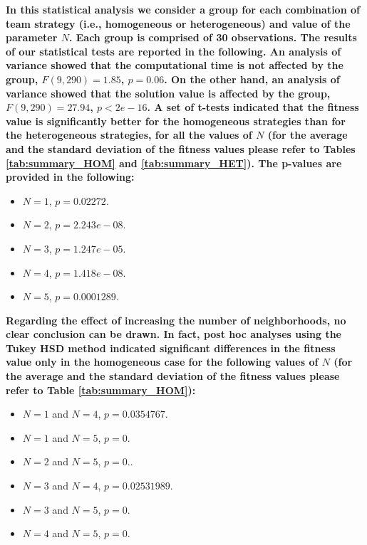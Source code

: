 \documentclass[journal]{IEEEtran}
\begin{document}
\textbf{In this statistical analysis we consider a group for each combination of team strategy (i.e., homogeneous or heterogeneous) and value of the parameter $N$. Each group is comprised of 30 observations. The results of our statistical tests are reported in the following. An analysis of variance showed that the computational time is not affected by the group, $F(9,290) = 1.85$, $p = 0.06$. On the other hand, an analysis of variance showed that the solution value is affected by the group, $F(9,290) = 27.94$, $p < 2e-16$.  A set of t-tests indicated that the fitness value is significantly better for the homogeneous strategies than for the heterogeneous strategies, for all the values of $N$ (for the average and the standard deviation of the fitness values please refer to Tables \ref{tab:summary_HOM} and \ref{tab:summary_HET}). The p-values are provided in the following:}

\begin{itemize}
\item $N=1$, $p = 0.02272$.
\item $N=2$, $p = 2.243e-08$.
\item $N=3$, $p = 1.247e-05$.
\item $N=4$, $p = 1.418e-08$.
\item $N=5$, $p = 0.0001289$.
\end{itemize}

\textbf{Regarding the effect of increasing the number of neighborhoods, no clear conclusion can be drawn. In fact, post hoc analyses using the Tukey HSD method indicated significant differences in the fitness value only in the homogeneous case for the following values of $N$ (for the average and the standard deviation of the fitness values please refer to Table \ref{tab:summary_HOM}):}

\begin{itemize}
\item $N=1$ and $N=4$, $p = 0.0354767$.
\item $N=1$ and $N=5$, $p = 0$.
\item $N=2$ and $N=5$, $p = 0.$.
\item $N=3$ and $N=4$, $p = 0.02531989$.
\item $N=3$ and $N=5$, $p = 0$.
\item $N=4$ and $N=5$, $p = 0$.
\end{itemize}
\end{document}
